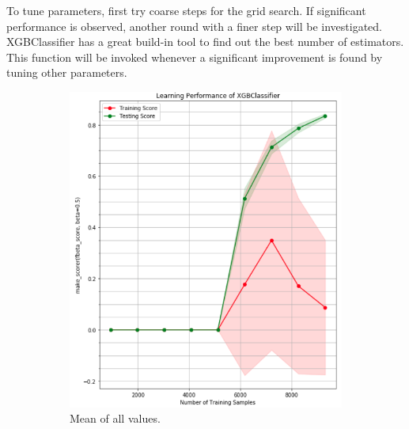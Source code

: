 \documentclass[a4paper]{article}
\begin{document}
			To tune parameters, first try coarse steps for the grid search. If significant performance is observed, another round with a finer step will be investigated. XGBClassifier has a great build-in tool to find out the best number of estimators. This function will be invoked whenever a significant improvement is found by tuning other parameters. 
	
			\begin{figure}
				\begin{subfigure}[b]{0.33\textwidth}
					\centering
					\includegraphics[width=1\textwidth]{xgbLearningCurve.png}\caption{\label{fig:xgb_lc}Mean of all values.}
				\end{subfigure}
				\begin{subfigure}[b]{0.33\textwidth}
					\centering

\end{subfigure}
\end{figure}
\end{document}
